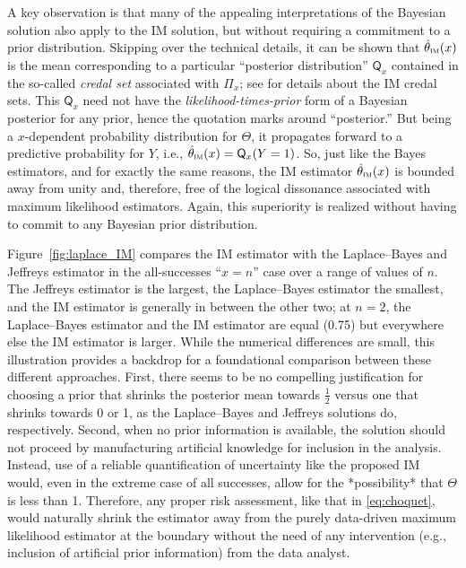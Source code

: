 \documentclass[a4paper, 12pt]{article}
\theoremstyle{plain}
\theoremstyle{definition}
\theoremstyle{remark}
\newcommand{\prior}{\mathsf{Q}}
\newcommand{\uPi}{\mathsf{\Pi}}%
\begin{document}
A key observation is that many of the appealing interpretations of the Bayesian solution also apply to the IM solution, but without requiring a commitment to a prior distribution.  Skipping over the technical details, it can be shown that $\hat\theta_\text{\sc im}(x)$ is the mean corresponding to a particular ``posterior distribution'' $\prior_x$ contained in the so-called {\em credal set} associated with $\uPi_x$; see \citet{imreview} for details about the IM credal sets.  This $\prior_x$ need not have the {\em likelihood-times-prior} form of a Bayesian posterior for any prior, hence the quotation marks around ``posterior.'' But being a $x$-dependent probability distribution for $\Theta$, it propagates forward to a predictive probability for $Y$, i.e., $\hat\theta_\text{\sc im}(x) = \prior_x(Y=1)$.  So, just like the Bayes estimators, and for exactly the same reasons, the IM estimator $\hat\theta_\text{\sc im}(x)$ is bounded away from unity and, therefore, free of the logical dissonance associated with maximum likelihood estimators.  Again, this superiority is realized without having to commit to any Bayesian prior distribution.

Figure~\ref{fig:laplace_IM} compares the IM estimator with the Laplace--Bayes and Jeffreys estimator in the all-successes ``$x=n$'' case over a range of values of $n$.  The Jeffreys estimator is the largest, the Laplace--Bayes estimator the smallest, and the IM estimator is generally in between the other two; at $n=2$, the Laplace--Bayes estimator and the IM estimator are equal (0.75) but everywhere else the IM estimator is larger.  While the numerical differences are small, this illustration provides a backdrop for a foundational comparison between these different approaches.  First, there seems to be no compelling justification for choosing a prior that shrinks the posterior mean towards $\frac12$ versus one that shrinks towards 0 or 1, as the Laplace--Bayes and Jeffreys solutions do, respectively.  Second, when no prior information is available, the solution should not proceed by manufacturing artificial knowledge for inclusion in the analysis.  Instead, use of a reliable quantification of uncertainty like the proposed IM would, even in the extreme case of all successes, allow for the *possibility* that $\Theta$ is less than 1. Therefore, any proper risk assessment, like that in \eqref{eq:choquet}, would naturally shrink the estimator away from the purely data-driven maximum likelihood estimator at the boundary without the need of any intervention (e.g., inclusion of artificial prior information) from the data analyst.  
\end{document}
